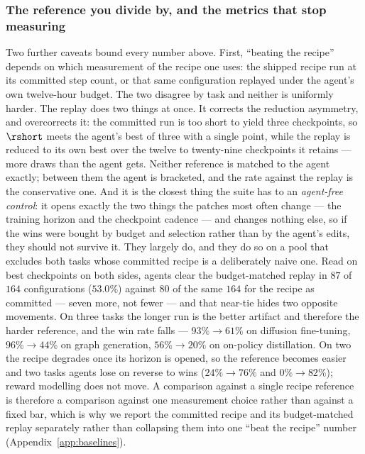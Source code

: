 \subsubsection{The reference you divide by, and the metrics that stop measuring}
\label{sec:validity}

Two further caveats bound every number above. First, ``beating the recipe'' depends on which
measurement of the recipe one uses: the shipped recipe run at its committed step count, or that same
configuration replayed under the agent's own twelve-hour budget. The two disagree by task and neither
is uniformly harder. The replay does two things at once. It corrects the reduction asymmetry, and
overcorrects it: the committed run is too short to yield three checkpoints, so $\rshort$ meets the
agent's best of three with a single point, while the replay is reduced to its own best over the twelve
to twenty-nine checkpoints it retains --- more draws than the agent gets. Neither reference is matched
to the agent exactly; between them the agent is bracketed, and the rate against the replay is the
conservative one. And it is the closest thing the suite has to an
\emph{agent-free control}: it opens exactly the two things the patches most often change --- the
training horizon and the checkpoint cadence --- and changes nothing else, so if the wins were bought by
budget and selection rather than by the agent's edits, they should not survive it. They largely do,
and they do so on a pool that excludes both tasks whose committed recipe is a deliberately naive one.
Read on best checkpoints on both sides, agents clear the budget-matched replay in $87$ of $164$
configurations ($53.0\%$) against $80$ of the same $164$ for the recipe as
committed --- seven more, not fewer --- and that near-tie hides
two opposite movements. On three tasks the longer run is the better artifact and therefore the harder
reference, and the win rate falls --- $93\%\!\to\!61\%$ on diffusion fine-tuning, $96\%\!\to\!44\%$ on
graph generation, $56\%\!\to\!20\%$ on on-policy distillation. On two the recipe degrades once its
horizon is opened, so the reference becomes easier and two tasks agents lose on reverse to wins
($24\%\!\to\!76\%$ and $0\%\!\to\!82\%$); reward modelling does not move. A comparison against a single recipe reference is therefore a comparison against
one measurement choice rather than against a fixed bar, which is why we report the committed recipe and its budget-matched replay
separately rather than collapsing them into one ``beat the recipe'' number
(Appendix~\ref{app:baselines}).

